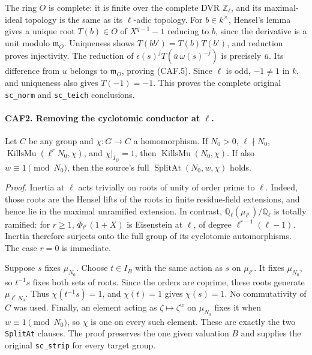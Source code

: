 \documentclass[11pt,a4paper]{article}
\numberwithin{equation}{section}
\theoremstyle{remark}\newtheorem{remark}[theorem]{Remark}
\begin{document}
The ring \(O\) is complete: it is finite over the complete DVR
\(\mathbb Z_\ell\), and its maximal-ideal topology is the same as
its \(\ell\)-adic topology.  For \(b\in k^\times\), Hensel's lemma
gives a unique root \(T(b)\in O\) of \(X^{q-1}-1\) reducing to
\(b\), since the derivative is a unit modulo \(\mathfrak m_O\).
Uniqueness shows \(T(bb')=T(b)T(b')\), and reduction proves
injectivity.  The reduction of
\(\epsilon(s)^jT(\overline u\,\omega(s)^{-j})\) is precisely
\(\overline u\).  Its difference from \(u\) belongs to
\(\mathfrak m_O\), proving (CAF.5).  Since \(\ell\) is odd,
\(-1\ne1\) in \(k\), and uniqueness also gives \(T(-1)=-1\).
This proves the complete original \texttt{sc\_\allowbreak norm} and
\texttt{sc\_\allowbreak teich} conclusions.

\paragraph{CAF2. Removing the cyclotomic conductor at \(\ell\).}
\label{claim:CAF2}
Let \(C\) be any group and \(\chi:G\to C\) a homomorphism.
If \(N_0>0\), \(\ell\nmid N_0\),
\(\operatorname{KillsMu}(\ell^rN_0,\chi)\), and
\(\chi|_{I_B}=1\), then
\(\operatorname{KillsMu}(N_0,\chi)\).
If also \(w\equiv1\pmod {N_0}\), then the source's full
\(\operatorname{SplitAt}(N_0,w,\chi)\) holds.

\emph{Proof.}
Inertia at \(\ell\) acts trivially on roots of unity of order prime
to \(\ell\).  Indeed, those roots are the Hensel lifts of the roots
in finite residue-field extensions, and hence lie in the maximal
unramified extension.  In contrast,
\(\mathbb Q_\ell(\mu_{\ell^r})/\mathbb Q_\ell\) is totally
ramified: for \(r\ge1\),
\(\Phi_{\ell^r}(1+X)\) is Eisenstein at \(\ell\), of degree
\(\ell^{r-1}(\ell-1)\).  Inertia therefore surjects onto the full
group of its cyclotomic automorphisms.  The case \(r=0\) is immediate.

Suppose \(s\) fixes \(\mu_{N_0}\).  Choose \(t\in I_B\) with the
same action as \(s\) on \(\mu_{\ell^r}\).  It fixes
\(\mu_{N_0}\), so \(t^{-1}s\) fixes both sets of roots.  Since the
orders are coprime, these roots generate \(\mu_{\ell^rN_0}\).
Thus \(\chi(t^{-1}s)=1\), and \(\chi(t)=1\) gives \(\chi(s)=1\).
No commutativity of \(C\) was used.  Finally, an element acting as
\(\zeta\mapsto\zeta^w\) on \(\mu_{N_0}\) fixes it when
\(w\equiv1\pmod {N_0}\), so \(\chi\) is one on every such
element.  These are exactly the two \texttt{Split\allowbreak At} clauses.
The proof preserves the one given valuation \(B\) and supplies the
original \texttt{sc\_\allowbreak strip} for every target group.
\end{document}
